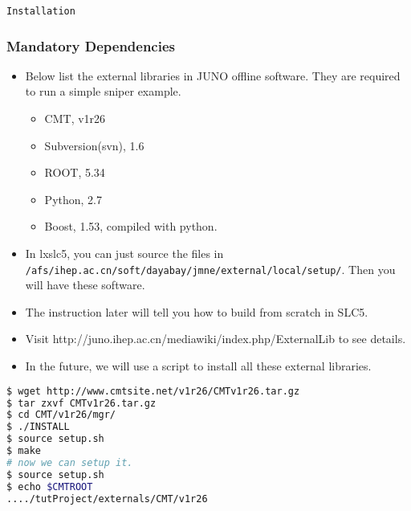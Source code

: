 \begin{frame}
    \begin{center}
        \LARGE \tt{Installation}
    \end{center}
\end{frame}

\begin{frame}
    \frametitle{Mandatory Dependencies}
\begin{itemize}
    \item Below list the external libraries in JUNO offline software.
    They are required to run a simple sniper example.
    \begin{itemize}
        \item CMT, v1r26
        \item Subversion(svn), 1.6
        \item ROOT, 5.34
        \item Python, 2.7
        \item Boost, 1.53, compiled with python.
    \end{itemize}
    \item In lxslc5, you can just source the files in
    {\tt /afs/ihep.ac.cn/soft/dayabay/jmne/external/local/setup/}.
    Then you will have these software.
    \item The instruction later will tell you how to build from scratch
    in SLC5.
    \item Visit http://juno.ihep.ac.cn/mediawiki/index.php/ExternalLib
    to see details.
    \item In the future, we will use a script to install all these external
    libraries.
\end{itemize}
\end{frame}

\newsavebox{\installcmt}
\begin{lrbox}{\installcmt}
\begin{lstlisting}[language=bash]
$ wget http://www.cmtsite.net/v1r26/CMTv1r26.tar.gz
$ tar zxvf CMTv1r26.tar.gz 
$ cd CMT/v1r26/mgr/
$ ./INSTALL 
$ source setup.sh 
$ make
# now we can setup it. 
$ source setup.sh 
$ echo $CMTROOT 
..../tutProject/externals/CMT/v1r26
\end{lstlisting}
\end{lrbox}

